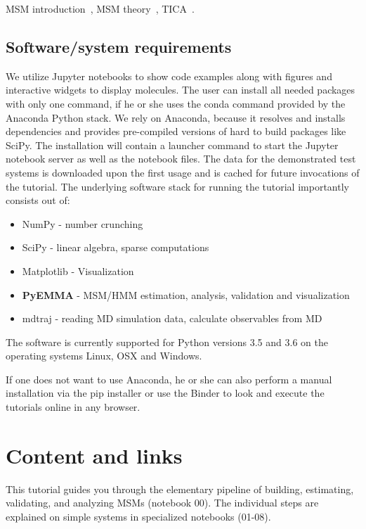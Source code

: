 \documentclass[9pt,tutorial,lineno,onehalfspacing]{livecoms}
\begin{document}
MSM introduction~\cite{msm-brooke}, MSM theory~\cite{msm-jhp,msm-book}, TICA~\cite{tica,tica3,tica2}.

\subsection{Software/system requirements}

We utilize Jupyter notebooks to show code examples along with figures and interactive widgets to display molecules. The user can install all needed packages with only one command, if he or she uses the conda command provided by the Anaconda Python stack. We rely on Anaconda, because it resolves and installs dependencies and provides pre-compiled versions of hard to build packages like SciPy. The installation will contain a launcher command to start the Jupyter notebook server as well as the notebook files. The data for the demonstrated test systems is downloaded upon the first usage and is cached for future invocations of the tutorial. The underlying software stack for running the tutorial importantly consists out of:
\begin{itemize}
 \item NumPy - number crunching
 \item SciPy - linear algebra, sparse computations
 \item Matplotlib - Visualization
 \item \textbf{PyEMMA} - MSM/HMM estimation, analysis, validation and visualization
 \item mdtraj - reading MD simulation data, calculate observables from MD
\end{itemize}

The software is currently supported for Python versions 3.5 and 3.6 on the operating systems Linux, OSX and Windows.

If one does not want to use Anaconda, he or she can also perform a manual installation via the pip installer or use the Binder to look and execute the tutorials online in any browser.


\section{Content and links}



This tutorial guides you through the elementary pipeline of building, estimating, validating, and analyzing MSMs (notebook 00). The individual steps are explained on simple systems in specialized notebooks (01-08).
\end{document}
